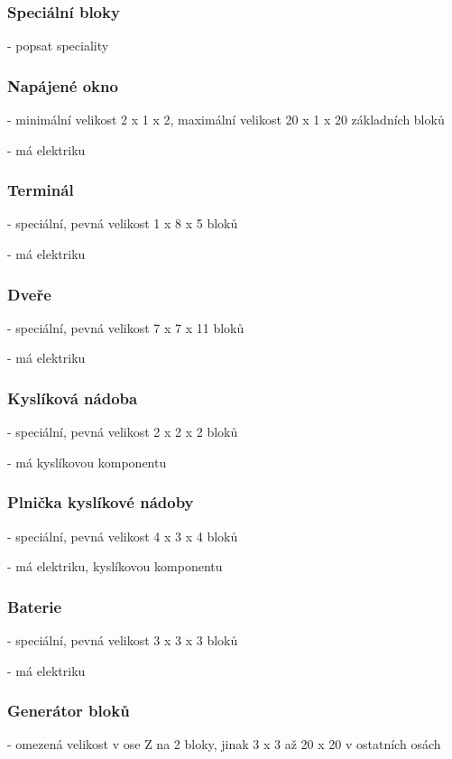 \subsubsection{Speciální bloky}
- popsat speciality

\subsubsection{Napájené okno}
- minimální velikost 2 x 1 x 2, maximální velikost 20 x 1 x 20 základních bloků

- má elektriku


\subsubsection{Terminál}
- speciální, pevná velikost 1 x 8 x 5 bloků

- má elektriku

\subsubsection{Dveře}
- speciální, pevná velikost 7 x 7 x 11 bloků

- má elektriku

\subsubsection{Kyslíková nádoba}
- speciální, pevná velikost 2 x 2 x 2 bloků

- má kyslíkovou komponentu

\subsubsection{Plnička kyslíkové nádoby}
- speciální, pevná velikost 4 x 3 x 4 bloků

- má elektriku, kyslíkovou komponentu


\subsubsection{Baterie}
- speciální, pevná velikost 3 x 3 x 3 bloků

- má elektriku

\subsubsection{Generátor bloků}

- omezená velikost v ose Z na 2 bloky, jinak 3 x 3 až 20 x 20 v ostatních osách

